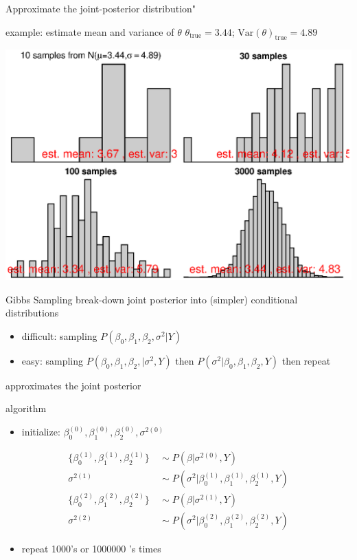 \documentclass[presentation,9pt,xcolor=dvipsnames]{beamer}
\begin{document}
\begin{frame}[label={sec:orgcd132a3}]{Approximate the joint-posterior distribution"}
\begin{block}{example: estimate mean and variance of \(\theta\)}
\(\theta_{\text{true}}=3.44\); \(\text{Var}(\theta)_{\text{true}}=4.89\)
\begin{center}
\includegraphics[width=.9\linewidth]{sample_approximations.eps}
\end{center}
\end{block}
\end{frame}
\begin{frame}[label={sec:org6f5e622}]{Gibbs Sampling}
break-down joint posterior into (simpler) conditional distributions
\begin{itemize}
\item difficult: sampling \(P(\beta_0,\beta_1,\beta_2,\sigma^2\vert Y)\)
\item easy: sampling \(P(\beta_0,\beta_1,\beta_2,\vert\sigma^2, Y)\) then \(P(\sigma^2\vert\beta_0,\beta_1,\beta_2,Y)\) then repeat
\end{itemize}
approximates the joint posterior
\begin{block}{algorithm}
\begin{itemize}
\item initialize: \(\beta_0^{(0)},\beta_1^{(0)},\beta_2^{(0)},\sigma^{2(0)}\)
\end{itemize}
\begin{equation}
\begin{aligned}
\{\beta_0^{(1)},\beta_1^{(1)},\beta_2^{(1)}\} &\ \sim P(\beta \vert \sigma^{2(0)},Y) \\
\sigma^{2(1)} &\ \sim P(\sigma^2 \vert \beta_0^{(1)},\beta_1^{(1)},\beta_2^{(1)},Y) \\
\{\beta_0^{(2)},\beta_1^{(2)},\beta_2^{(2)}\} &\ \sim P(\beta \vert \sigma^{2(1)},Y) \\
\sigma^{2(2)} &\ \sim P(\sigma^2 \vert \beta_0^{(2)},\beta_1^{(2)},\beta_2^{(2)},Y)
\end{aligned}
\end{equation}
\begin{itemize}
\item repeat 1000's or 1000000 's times
\end{itemize}
\end{block}
\end{frame}
\end{document}
